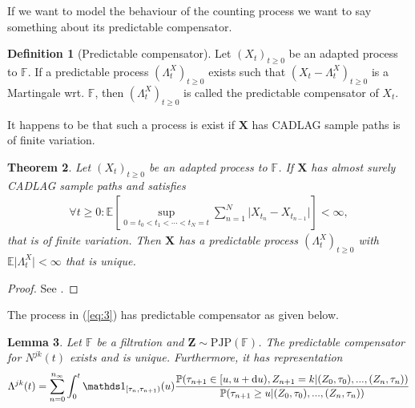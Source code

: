 \documentclass[12pt,letter,twoside]{article}
\theoremstyle{plain}
\newtheorem{theorem}{Theorem}
\newtheorem{lemma}[theorem]{Lemma}
\theoremstyle{definition}
\newtheorem{definition}[theorem]{Definition}
\theoremstyle{remark}
\begin{document}
If we want to model the behaviour of the counting process we want to say something about its predictable compensator.
\begin{definition}[Predictable compensator]
Let $(X_t)_{t\ge 0}$ be an adapted process to $\mathbb F$. If a predictable process $(\Lambda^X_t)_{t\ge 0}$ exists such that $(X_t-\Lambda^X_t)_{t\ge 0}$ is a Martingale wrt. $\mathbb F$, then $(\Lambda^X_t)_{t\ge 0}$ is called the predictable compensator of $X_t$.
\end{definition}
It happens to be that such a process is exist if $\mathbf X$ has CADLAG sample paths is of finite variation.
\begin{theorem}
Let $(X_t)_{t\ge 0}$ be an adapted process to $\mathbb F$. If $\mathbf X$ has almost surely CADLAG sample paths and satisfies
\begin{align}
\forall t\ge 0 : \mathbb E\left[\sup_{0=t_0<t_1<\cdots < t_N=t} \sum_{n=1}^N \vert X_{t_n}-X_{t_{n-1}} \vert \right]<\infty,
\end{align}
that is of finite variation. Then $\mathbf X$ has a predictable process $(\Lambda^X_t)_{t\ge 0}$ with $\mathbb E\vert \Lambda^X_t\vert <\infty$ that is unique.
\end{theorem}
\begin{proof}
See \cite{lund2022}.
\end{proof}
The process in (\ref{eq:3}) has predictable compensator as given below.
\begin{lemma}
Let $\mathbb F$ be a filtration and $\mathbf Z\sim\text{PJP}(\mathbb F)$. The predictable compensator for $N^{jk}(t)$ exists and is unique. Furthermore, it has representation
\begin{align*}
\Lambda^{jk}(t)=\sum_{n=0}^{n_\infty}\int_0^t \mathds 1_{[\tau_n,\tau_{n+1})}(u)\frac{\mathbb P(\tau_{n+1}\in [u,u+\text du), Z_{n+1}=k\vert (Z_0,\tau_0),...,(Z_n,\tau _n))}{\mathbb P(\tau_{n+1}\ge u\vert (Z_0,\tau_0),...,(Z_n,\tau _n))}
\end{align*}
\end{lemma}
\end{document}
